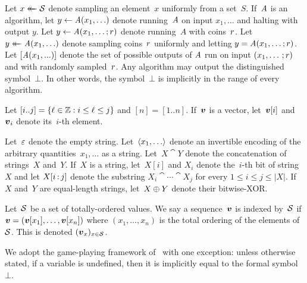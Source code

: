 %
\label{sec-prelims}

Let $x \mathrel{\leftarrow\mkern-14mu\leftarrow} \mathcal{S}$ denote sampling an element~$x$ uniformly from a set~$S$.
%
If~$\mathit{A}$ is an algorithm, let $y \gets \mathit{A}(x_1, \ldots)$ denote
running~$\mathit{A}$ on input $x_1, \ldots$ and halting with output $y$.
%
Let $y \gets \mathit{A}(x_1, \ldots; r)$ denote running~$A$ with coins~$r$.
Let $y \mathrel{\leftarrow\mkern-14mu\leftarrow} \mathit{A}(x_1, \ldots)$ denote sampling coins~$r$ uniformly and
letting $y = \mathit{A}(x_1, \ldots; r)$.
%
Let $[\mathit{A}(x_1, ...)]$ denote the set of possible outputs of $\mathit{A}$ run on input
$(x_1, \ldots \,; r)$ and with randomly sampled~$r$.
%
Any algorithm may output the distinguished symbol~$\bot$. In other words, the
symbol~$\bot$ is implicitly in the range of every algorithm.

Let $[i..j] = \{ \ell \in \mathbb{Z} : i \le \ell \le j \}$ and $[n] = [1..n]$.
%
If~$\vv$ is a vector, let~$\vv[i]$ and $\vv_i$ denote its~$i$-th element.

Let~$\varepsilon$ denote the empty string.
%
Let~$\str(x_1, \ldots)$ denote an invertible encoding of the arbitrary
quantities~$x_1, \ldots$ as a string.
%
Let~$X \cat Y$ denote the concatenation of strings~$X$ and~$Y$.
%
If~$X$ is a string, let~$X[i]$ and $X_i$ denote the~$i$-th bit of string~$X$ and
let $\substr(X,i,j)$ denote the substring $X_i \cat \cdots \cat X_j$ for every $1
\leq i \leq j \leq |X|$.
%
If~$X$ and~$Y$ are equal-length strings, let~$X \mathbin{\oplus} Y$ denote their
bitwise-XOR.

Let~$\mathcal{S}$ be a set of totally-ordered values. We say a sequence~$\vv$ is
indexed by~$\mathcal{S}$ if $\vv = (\vv[x_1], \ldots, \vv[x_n])$ where $(x_1, \ldots,
x_n)$ is the total ordering of the elements of~$\mathcal{S}$. This is denoted
$(\vv_x)_{x\in \setS}$.

We adopt the game-playing framework of~\cite{games} with one exception: unless
otherwise stated, if a variable is undefined, then it is implicitly equal to the
formal symbol~$\bot$.
